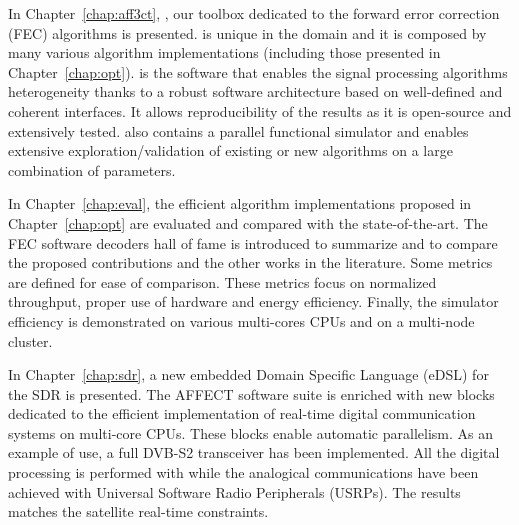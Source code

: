 In Chapter~\ref{chap:aff3ct}, \AFFECT, our toolbox dedicated to the forward
error correction (FEC) algorithms is presented. \AFFECT is unique in the domain
and it is composed by many various algorithm implementations (including those
presented in Chapter~\ref{chap:opt}). \AFFECT is the software that enables the
signal processing algorithms heterogeneity thanks to a robust software
architecture based on well-defined and coherent interfaces. It allows
reproducibility of the results as it is open-source and extensively tested.
\AFFECT also contains a parallel functional simulator and enables extensive
exploration/validation of existing or new algorithms on a large combination of
parameters.

In Chapter~\ref{chap:eval}, the efficient algorithm implementations proposed
in Chapter~\ref{chap:opt} are evaluated and compared with the state-of-the-art.
The FEC software decoders hall of fame is introduced to summarize and to compare
the proposed contributions and the other works in the literature. Some metrics
are defined for ease of comparison. These metrics focus on normalized
throughput, proper use of hardware and energy efficiency. Finally, the \AFFECT
simulator efficiency is demonstrated on various multi-cores CPUs and on
a multi-node cluster.

In Chapter~\ref{chap:sdr}, a new embedded Domain Specific Language (eDSL) for
the SDR is presented. The AFFECT software suite is enriched with new blocks
dedicated to the efficient implementation of real-time digital communication
systems on multi-core CPUs. These blocks enable automatic parallelism. As an
example of use, a full DVB-S2 transceiver has been implemented. All the digital
processing is performed with \AFFECT while the analogical communications have
been achieved with Universal Software Radio Peripherals (USRPs). The results
matches the satellite real-time constraints.
